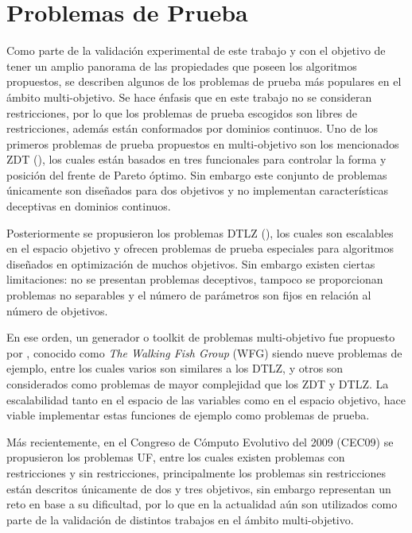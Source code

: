\section{Problemas de Prueba}
Como parte de la validación experimental de este trabajo y con el objetivo de tener un amplio panorama de las propiedades que poseen los algoritmos propuestos, se describen algunos de los problemas de prueba más populares en el ámbito multi-objetivo.
%
Se hace énfasis que en este trabajo no se consideran restricciones, por lo que los problemas de prueba escogidos son libres de restricciones, además están conformados por dominios  continuos.
%
Uno de los primeros problemas de prueba propuestos en multi-objetivo son los mencionados ZDT (\cite{Joel:ZDT}), los cuales están basados en tres funcionales para controlar la forma y posición del frente de Pareto óptimo.
%
Sin embargo este conjunto de problemas únicamente son diseñados para dos objetivos y no implementan características deceptivas en dominios continuos.
%

Posteriormente se propusieron los problemas DTLZ (\cite{Joel:DTLZ_2}), los cuales son escalables en el espacio objetivo y ofrecen problemas de prueba especiales para algoritmos diseñados en optimización de muchos objetivos.
%
Sin embargo existen ciertas limitaciones: no se presentan problemas deceptivos, tampoco se proporcionan problemas no separables y el número de parámetros son fijos en relación al número de objetivos.
%

En ese orden, un generador o toolkit de problemas multi-objetivo fue propuesto por \cite{Joel:WFG}, conocido como \textit{The Walking Fish Group} (WFG) siendo nueve problemas de ejemplo, entre los cuales varios son similares a los DTLZ,  y otros son considerados como problemas de mayor complejidad que los ZDT y DTLZ. 
%
La escalabilidad tanto en el espacio de las variables como en el espacio objetivo, hace viable implementar estas funciones de ejemplo como problemas de prueba. 

%
Más recientemente, en el Congreso de Cómputo Evolutivo del 2009 (CEC09) se propusieron los problemas UF, entre los cuales existen problemas con restricciones y sin restricciones, principalmente los problemas sin restricciones están descritos únicamente de dos y tres objetivos, sin embargo representan un reto en base a su dificultad, por lo que en la actualidad aún son utilizados como parte de la validación de distintos trabajos en el ámbito multi-objetivo.

